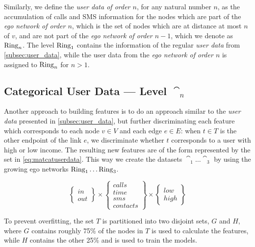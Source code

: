 Similarly, we define the \emph{user data of order $n$}, for any natural number $n$, as the accumulation of calls and SMS information for the nodes which are part of the \emph{ego network of order $n$}, which is the set of nodes which are at distance at most $n$ of $v$, and are not part of the \emph{ego network of order $n - 1$}, which we denote as $\operatorname{Ring}_n$. 
The level $\operatorname{Ring}_1$ contains the information of the regular \emph{user data} from \cref{subsec:user_data}, while the user data from the \emph{ego network of order $n$} is assigned to $\operatorname{Ring}_n$ for $n > 1$.

\subsection{Categorical User Data --- Level $\cat_n$}
\label{subsec:categoricaluserdata}

Another approach to building features is to do an approach similar to the \emph{user data} presented in \cref{subsec:user_data}, but further discriminating each feature which corresponds to each node $v \in V$ and each edge $e \in E$:
when $t \in T$ is the other endpoint of the link $e$, we discriminate whether $t$ corresponds to a user with high or low income. 
The resulting new features are of the form represented by the set in \cref{eq:matcatuserdata}. This way we create the datasets $\cat_1 \dots \cat_3$ by using the growing ego networks $\operatorname{Ring}_1 \dots \operatorname{Ring}_3$.

\begin{equation}
\begin{Bmatrix} in \\ out \end{Bmatrix}
\times
\begin{Bmatrix} calls \\ time \\ sms \\ contacts \end{Bmatrix}
\times
\begin{Bmatrix} low \\ high \end{Bmatrix}
\label{eq:matcatuserdata}
\end{equation}

To prevent overfitting, the set $T$ is partitioned into two disjoint sets, $G$ and $H$, where $G$ contains roughly 75\% of the nodes in $T$ is used to calculate the features, while $H$ contains the other 25\% and is used to train the models.
